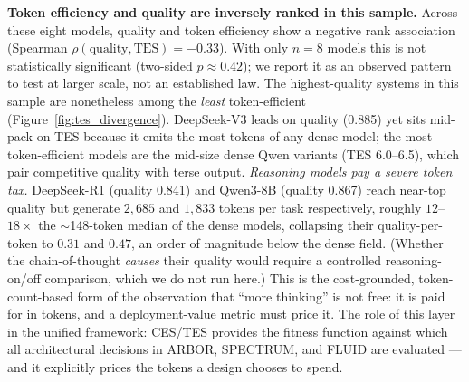 \documentclass[12pt]{article}
\begin{document}
\textbf{Token efficiency and quality are inversely ranked in this sample.} Across these eight models, quality and token efficiency show a negative rank association (Spearman $\rho(\text{quality}, \text{TES}) = -0.33$). With only $n=8$ models this is not statistically significant (two-sided $p \approx 0.42$); we report it as an observed pattern to test at larger scale, not an established law. The highest-quality systems in this sample are nonetheless among the \emph{least} token-efficient (Figure~\ref{fig:tes_divergence}). DeepSeek-V3 leads on quality (0.885) yet sits mid-pack on TES because it emits the most tokens of any dense model; the most token-efficient models are the mid-size dense Qwen variants (TES 6.0--6.5), which pair competitive quality with terse output. \emph{Reasoning models pay a severe token tax.} DeepSeek-R1 (quality 0.841) and Qwen3-8B (quality 0.867) reach near-top quality but generate $2{,}685$ and $1{,}833$ tokens per task respectively, roughly $12$--$18\times$ the $\sim$148-token median of the dense models, collapsing their quality-per-token to $0.31$ and $0.47$, an order of magnitude below the dense field. (Whether the chain-of-thought \emph{causes} their quality would require a controlled reasoning-on/off comparison, which we do not run here.) This is the cost-grounded, token-count-based form of the observation that ``more thinking'' is not free: it is paid for in tokens, and a deployment-value metric must price it. The role of this layer in the unified framework: CES/TES provides the fitness function against which all architectural decisions in ARBOR, SPECTRUM, and FLUID are evaluated --- and it explicitly prices the tokens a design chooses to spend.
\end{document}
